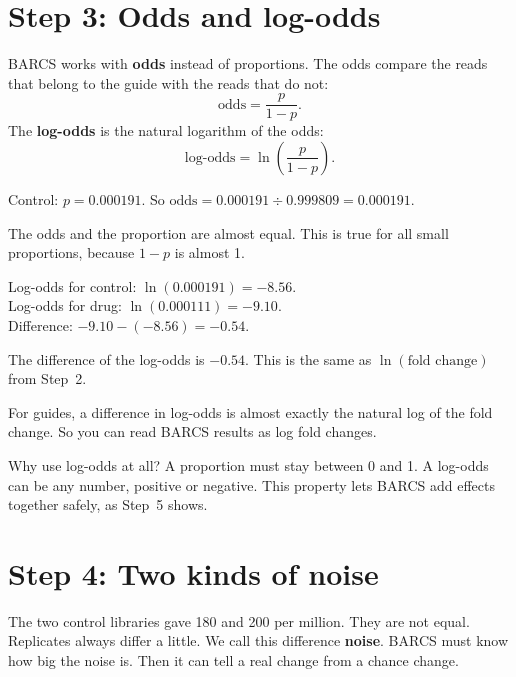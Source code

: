 \section{Step 3: Odds and log-odds}

BARCS works with \textbf{odds} instead of proportions. The odds compare the
reads that belong to the guide with the reads that do not:
\[
\text{odds} = \frac{p}{1-p}.
\]
The \textbf{log-odds} is the natural logarithm of the odds:
\[
\text{log-odds} = \ln\!\left(\frac{p}{1-p}\right).
\]

\begin{worked}
Control: $p = 0.000191$. So
$\text{odds} = 0.000191 \div 0.999809 = 0.000191$.

The odds and the proportion are almost equal. This is true for all small
proportions, because $1-p$ is almost 1.

Log-odds for control: $\ln(0.000191) = -8.56$.\\
Log-odds for drug: $\ln(0.000111) = -9.10$.\\
Difference: $-9.10 - (-8.56) = -0.54$.

The difference of the log-odds is $-0.54$. This is the same as
$\ln(\text{fold change})$ from Step~2.
\end{worked}

\begin{remember}
For guides, a difference in log-odds is almost exactly the natural log of
the fold change. So you can read BARCS results as log fold changes.
\end{remember}

Why use log-odds at all? A proportion must stay between 0 and 1. A log-odds
can be any number, positive or negative. This property lets BARCS add
effects together safely, as Step~5 shows.

\section{Step 4: Two kinds of noise}

The two control libraries gave 180 and 200 per million. They are not equal.
Replicates always differ a little. We call this difference
\textbf{noise}. BARCS must know how big the noise is. Then it can tell a
real change from a chance change.


